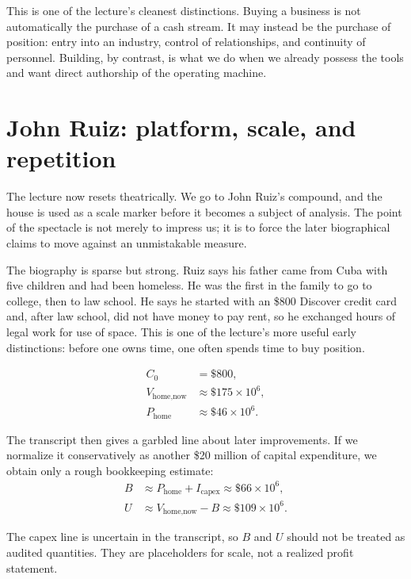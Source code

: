 This is one of the lecture's cleanest distinctions. Buying a business is not automatically the purchase of a cash stream. It may instead be the purchase of position: entry into an industry, control of relationships, and continuity of personnel. Building, by contrast, is what we do when we already possess the tools and want direct authorship of the operating machine.

\section{John Ruiz: platform, scale, and repetition}

The lecture now resets theatrically. We go to John Ruiz's compound, and the house is used as a scale marker before it becomes a subject of analysis. The point of the spectacle is not merely to impress us; it is to force the later biographical claims to move against an unmistakable measure.

The biography is sparse but strong. Ruiz says his father came from Cuba with five children and had been homeless. He was the first in the family to go to college, then to law school. He says he started with an \$800 Discover credit card and, after law school, did not have money to pay rent, so he exchanged hours of legal work for use of space. This is one of the lecture's more useful early distinctions: before one owns time, one often spends time to buy position.

\begin{align}
C_0 &= \$800,\\
V_{\text{home,now}} &\approx \$175 \times 10^6,\\
P_{\text{home}} &\approx \$46 \times 10^6.
\end{align}

The transcript then gives a garbled line about later improvements. If we normalize it conservatively as another \$20 million of capital expenditure, we obtain only a rough bookkeeping estimate:
\begin{align}
B &\approx P_{\text{home}} + I_{\text{capex}} \approx \$66 \times 10^6,\\
U &\approx V_{\text{home,now}} - B \approx \$109 \times 10^6.
\end{align}

\begin{remark}
The capex line is uncertain in the transcript, so \(B\) and \(U\) should not be treated as audited quantities. They are placeholders for scale, not a realized profit statement.
\end{remark}

